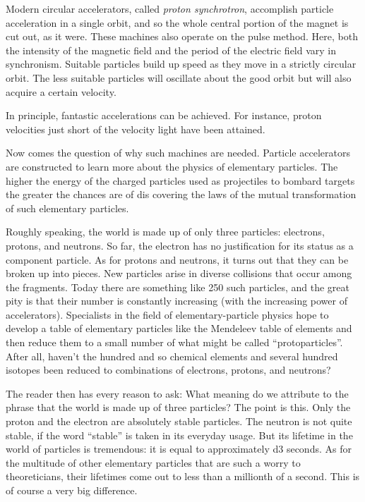 Modern circular accelerators, called \emph{proton synchrotron}, accomplish particle acceleration in a single orbit, and so the whole central portion of the magnet is cut out, as it were. These machines also operate on the pulse meth­od. Here, both the intensity of the magnetic field and the period of the electric field vary in synchronism. Suitable particles build up speed as they move in a strict­ly circular orbit. The less suitable particles will oscillate about the good orbit but will also acquire a certain veloc­ity.

In principle, fantastic accelerations can be achieved. For instance, proton velocities just short of the velocity light have been attained.

Now comes the question of why such machines are needed. Particle accelerators are constructed to learn more about the physics of elementary particles. The higher the energy of the charged particles used as projectiles to bombard targets the greater the chances are of dis­ covering the laws of the mutual transformation of such elementary particles.

Roughly speaking, the world is made up of only three particles: electrons, protons, and neutrons. So far, the electron has no justification for its status as a component particle. As for protons and neutrons, it turns out that they can be broken up into pieces. New particles arise in diverse collisions that occur among the fragments. Today there are something like 250 such particles, and the great pity is that their number is constantly increasing (with the increasing power of accelerators). Specialists in the field of elementary-particle physics hope to develop a table of elementary particles like the Mendeleev table of elements and then reduce them to a small number of what might be called ``protoparticles''. After all, haven't the hundred and so chemical elements and several hundred isotopes been reduced to combinations of electrons, protons, and neutrons?

The reader then has every reason to ask: What meaning do we attribute to the phrase that the world is made up of three particles? The point is this. Only the proton and the electron are absolutely stable particles. The neu­tron is not quite stable, if the word ``stable'' is taken in its everyday usage. But its lifetime in the world of particles is tremendous: it is equal to approximately \num{d3} seconds. As for the multitude of other elementary particles that are such a worry to theoreticians, their lifetimes come out to less than a millionth of a second. This is of course a very big difference.

